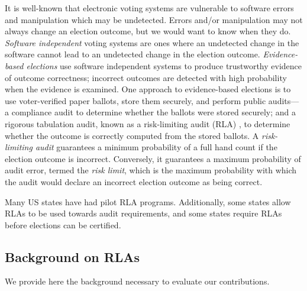 It is well-known that electronic voting systems are vulnerable to software errors and manipulation which may be undetected. Errors and/or manipulation may not always change an election outcome, but we would want to know when they do. {\em Software independent} voting systems \cite{SI-Wack,rivest2008notion} are ones where an undetected change in the software cannot lead to an undetected change in the election outcome. {\em Evidence-based elections} \cite{evidence-based} use software independent systems to produce trustworthy evidence of outcome correctness; incorrect outcomes are detected with high probability when the evidence is examined. One approach to evidence-based elections is to use voter-verified paper ballots, store them securely, and perform public audits---a compliance audit to determine whether the ballots were stored securely; and a rigorous tabulation audit, known as a risk-limiting audit (RLA) \cite{RLA}, to determine whether the outcome is correctly computed from the stored ballots.  A {\em risk-limiting audit} guarantees a minimum probability of a full hand count if the election outcome is incorrect. Conversely, it guarantees a maximum probability of audit error, termed the {\em risk limit}, which is the maximum probability with which the audit would declare an incorrect election outcome as being correct. 

Many US states have had pilot RLA programs. Additionally, some states allow RLAs to be used towards audit requirements, and some states require RLAs before elections can be certified. 


\subsection{Background on RLAs}
We provide here the background necessary to evaluate our contributions. 

